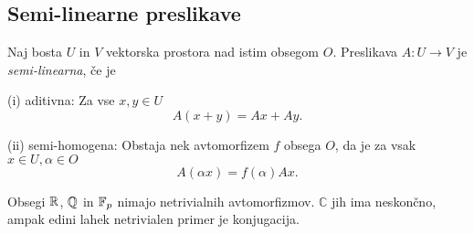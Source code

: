 \subsection{Semi-linearne preslikave}

\begin{definicija}
    Naj bosta $U$ in $V$ vektorska prostora nad istim obsegom $O$. Preslikava $A: U \to V$ je \emph{semi-linearna}, če je

    (i) aditivna: Za vse $x,y \in U$
    \[
    A(x + y) = Ax + Ay.    
    \]

    (ii) semi-homogena: Obstaja nek avtomorfizem $f$ obsega $O$, da je za vsak $x \in U, \alpha \in O$
    \[
    A(\alpha x) = f(\alpha) Ax.
    \]
\end{definicija}

\begin{opomba}
    Obsegi $\mathbb{R}$, $\mathbb{Q}$ in $\mathbb{F}_p$ nimajo netrivialnih avtomorfizmov. $\mathbb{C}$ jih ima neskončno, ampak edini lahek netrivialen primer je konjugacija.
\end{opomba}
